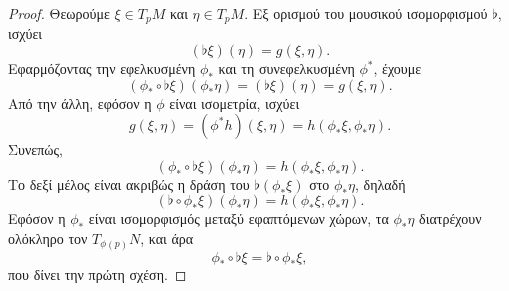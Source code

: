 \documentclass[11pt,a4paper,twoside,openright]{book}
\begin{document}
\begin{proof}
Θεωρούμε $\xi \in T_pM$ και $\eta \in T_pM$. Εξ ορισμού του μουσικού ισομορφισμού $\flat$, ισχύει
\begin{equation*}
(\flat \xi)(\eta) = g(\xi, \eta).
\end{equation*}
Εφαρμόζοντας την εφελκυσμένη $\phi_*$ και τη συνεφελκυσμένη $\phi^*$, έχουμε
\begin{equation*}
(\phi_* \circ \flat \xi)(\phi_* \eta)
=
(\flat \xi)(\eta)
=
g(\xi, \eta).
\end{equation*}
Από την άλλη, εφόσον η $\phi$ είναι ισομετρία, ισχύει
\begin{equation*}
g(\xi, \eta)
=
(\phi^* h)(\xi, \eta)
=
h(\phi_* \xi, \phi_* \eta).
\end{equation*}
Συνεπώς,
\begin{equation*}
(\phi_* \circ \flat \xi)(\phi_* \eta)
=
h(\phi_* \xi, \phi_* \eta).
\end{equation*}
Το δεξί μέλος είναι ακριβώς η δράση του $\flat (\phi_* \xi)$ στο $\phi_* \eta$, δηλαδή
\begin{equation*}
(\flat \circ \phi_* \xi)(\phi_* \eta)
=
h(\phi_* \xi, \phi_* \eta).
\end{equation*}
Εφόσον η $\phi_*$ είναι ισομορφισμός μεταξύ εφαπτόμενων χώρων, τα $\phi_* \eta$ διατρέχουν ολόκληρο τον $T_{\phi(p)}N$, και άρα
\begin{equation*}
\phi_* \circ \flat \xi = \flat \circ \phi_* \xi,
\end{equation*}
που δίνει την πρώτη σχέση.


\end{proof}
\end{document}
